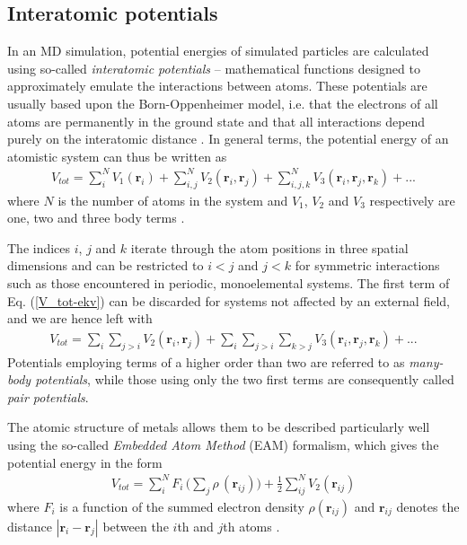 \subsection{Interatomic potentials}

In an MD simulation, potential energies of simulated particles are calculated using so-called \textit{interatomic potentials} -- mathematical functions designed to approximately emulate the interactions between atoms. 
These potentials are usually based upon the Born-Oppenheimer model, i.e. that the electrons of all atoms are permanently in the ground state and that all interactions depend purely on the interatomic distance \cite{born1927quantentheorie}. 
In general terms, the potential energy of an atomistic system can thus be written as
\begin{align}
V_{tot} = \sum_i^N V_1(\mathbf{r}_i) + \sum_{i,j}^N V_2(\mathbf{r}_i, \mathbf{r}_j) +  \sum_{i,j,k}^N V_3(\mathbf{r}_i, \mathbf{r}_j, \mathbf{r}_k) + ...
\label{V_tot-ekv}
\end{align}
where $N$ is the number of atoms in the system and $V_1$, $V_2$ and $V_3$ respectively are one, two and three body terms \cite{potentialsTheory}.

The indices $i$, $j$ and $k$ iterate through the atom positions in three spatial dimensions and can be restricted to $i < j$ and $j < k$ for symmetric interactions such as those encountered in periodic, monoelemental systems. 
The first term of Eq. (\ref{V_tot-ekv}) can be discarded for systems not affected by an external field, and we are hence left with
\begin{align}
V_{tot} = \sum_i \sum_{j>i} V_2(\mathbf{r}_i, \mathbf{r}_j) + \sum_i \sum_{j>i} \sum_{k > j} V_3(\mathbf{r}_i, \mathbf{r}_j, \mathbf{r}_k) + ...
\end{align}
Potentials employing terms of a higher order than two are referred to as \textit{many-body potentials}, while those using only the two first terms are consequently called \textit{pair potentials}.

The atomic structure of metals allows them to be described particularly well using the so-called \textit{Embedded Atom Method} (EAM) formalism, which gives the potential energy in the form
\begin{align}
V_{tot} = \sum_i^N F_i\, \bigg( \sum_j \rho\, (\mathbf{r}_{ij}) \bigg) + \frac{1}{2} \sum^N_{ij} V_2 (\mathbf{r}_{ij})
\end{align}
where  $F_i$ is a function of the summed electron density $\rho (\mathbf{r}_{ij})$ and $\mathbf{r}_{ij}$ denotes the distance $| \mathbf{r}_i - \mathbf{r}_j |$ between the $i$th and $j$th atoms \cite{EAMmodel,dudarevEAMpotential}. 

